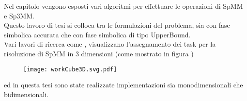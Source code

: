 Nel capitolo  vengono esposti vari algoritmi per effettuare le operazioni di SpMM e Sp3MM.\\
Questo lavoro di tesi si colloca tra le formulazioni \rowbyrow del problema, 
sia con fase simbolica accurata che con fase simbolica di tipo UpperBound.\\
Vari lavori di ricerca come , visualizzano 
l'assegnamento dei task per la risoluzione di SpMM in 3 dimensioni (come mostrato in figura )
\begin{figure}[H]
  \centering \texttt{[image: workCube3D.svg.pdf]}
\end{figure}
ed in questa tesi sono state realizzate implementazioni sia monodimensionali che bidimensionali.

